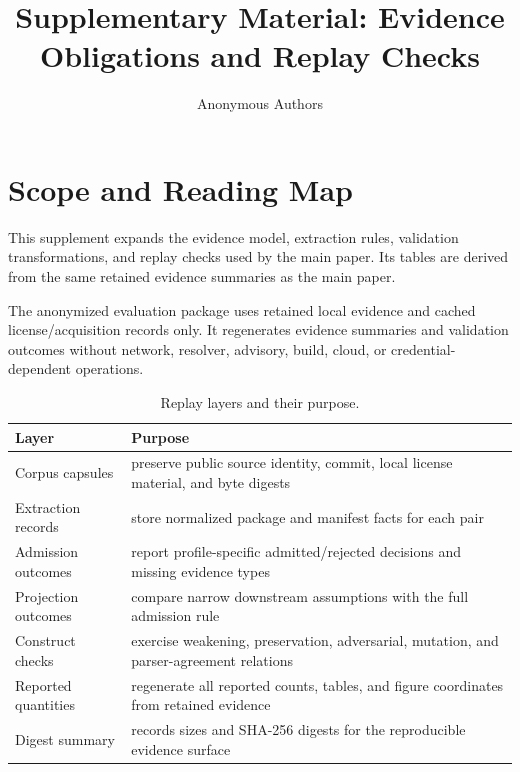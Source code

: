 \documentclass[10pt,conference]{IEEEtran}
\begin{document}
\title{Supplementary Material: Evidence Obligations and Replay Checks}
\author{Anonymous Authors}
\maketitle

\section{Scope and Reading Map}
This supplement expands the evidence model, extraction rules, validation transformations, and replay checks used by the main paper. Its tables are derived from the same retained evidence summaries as the main paper.

The anonymized evaluation package uses retained local evidence and cached license/acquisition records only. It regenerates evidence summaries and validation outcomes without network, resolver, advisory, build, cloud, or credential-dependent operations.

\begin{table}[t]
\caption{Replay layers and their purpose.}
\centering\small
\begin{tabularx}{\columnwidth}{p{}X}
\toprule
Layer & Purpose\\
\midrule
Corpus capsules & preserve public source identity, commit, local license material, and byte digests\\
Extraction records & store normalized package and manifest facts for each pair\\
Admission outcomes & report profile-specific admitted/rejected decisions and missing evidence types\\
Projection outcomes & compare narrow downstream assumptions with the full admission rule\\
Construct checks & exercise weakening, preservation, adversarial, mutation, and parser-agreement relations\\
Reported quantities & regenerate all reported counts, tables, and figure coordinates from retained evidence\\
Digest summary & records sizes and SHA-256 digests for the reproducible evidence surface\\
\bottomrule
\end{tabularx}
\end{table}
\end{document}
